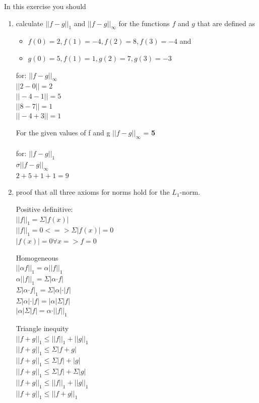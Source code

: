 \documentclass{WeSTassignment}
\begin{document}
In this exercise you should
\begin{enumerate}
\item calculate $||f - g||_1$ and $||f -g||_\infty$ for the functions $f$ and $g$ that are defined as \begin{itemize}
\item $f(0) = 2, f(1) = -4, f(2) = 8, f(3) = -4$ and 
\item $g(0) = 5, f(1) = 1, g(2) = 7, g(3) = -3$ \end{itemize}
for: $||f - g||_\infty$
\\$||2 - 0|| = 2$
\\$||-4 - 1|| = 5$
\\$||8 - 7|| = 1$
\\$||-4 + 3|| = 1$

For the given values of f and g  $||f - g||_\infty$ = \textbf{5}
\\\\for: $||f-g||_1$
\\ $\sigma ||f-g||_\infty$
\\ $2 + 5 + 1 + 1 = 9$
\item proof that all three axioms for norms hold for the $L_1$-norm.

Positive definitive:
\\ $||f||_1 = \Sigma|f(x)|$
\\ $||f||_1 = 0 <=> \Sigma |f(x)| = 0$
\\ $|f(x)| = 0 ∀x => f = 0$

Homogeneous
\\$||αf||_1 = α||f||_1$
\\$α||f||_1 = \Sigma |α·f|$
\\$\Sigma |α·f|_1 = \Sigma |α|·|f|$
\\$\Sigma |α|·|f| = |α|\Sigma|f|$
\\$|α|\Sigma|f| = α·||f||_1$

Triangle inequity
\\$||f+g||_1 \leq ||f||_1 + ||g||_1$
\\$||f+g||_1 \leq \Sigma |f+g|$
\\$||f+g||_1 \leq \Sigma |f| + |g|$
\\$||f+g||_1 \leq \Sigma|f| + \Sigma |g|$
\\$||f+g||_1 \leq ||f||_1 + ||g||_1$
\\$||f+g||_1 \leq ||f + g||_1$
\end{enumerate}
\end{document}
